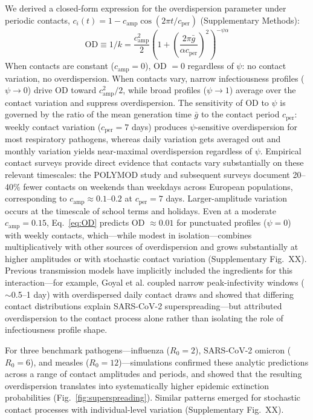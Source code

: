 \documentclass[10pt]{article}
\begin{document}
We derived a closed-form expression for the overdispersion parameter under periodic contacts, $c_i(t) = 1 - c_\text{amp}\cos(2\pi t / c_\text{per})$ (Supplementary Methods):
%
\begin{equation}
	\text{OD} \equiv 1/k = \frac{c_\text{amp}^2}{2} \left(1 + \left(\frac{2\pi \bar{g}}{\alpha c_\text{per}}\right)^2\right)^{-\psi\alpha}
	\label{eq:OD}
\end{equation}
%
When contacts are constant ($c_\text{amp} = 0$), OD $= 0$ regardless of $\psi$: no contact variation, no overdispersion. When contacts vary, narrow infectiousness profiles ($\psi \to 0$) drive OD toward $c_\text{amp}^2/2$, while broad profiles ($\psi \to 1$) average over the contact variation and suppress overdispersion. The sensitivity of OD to $\psi$ is governed by the ratio of the mean generation time $\bar{g}$ to the contact period $c_\text{per}$: weekly contact variation ($c_\text{per} = 7$ days) produces $\psi$-sensitive overdispersion for most respiratory pathogens, whereas daily variation gets averaged out and monthly variation yields near-maximal overdispersion regardless of $\psi$. Empirical contact surveys provide direct evidence that contacts vary substantially on these relevant timescales: the POLYMOD study\citep{mossong_social_2008} and subsequent surveys\citep{jarvis_quantifying_2020} document 20--40\% fewer contacts on weekends than weekdays across European populations, corresponding to $c_\text{amp} \approx 0.1$--$0.2$ at $c_\text{per} = 7$ days. Larger-amplitude variation occurs at the timescale of school terms and holidays. Even at a moderate $c_\text{amp} = 0.15$, Eq.~\ref{eq:OD} predicts OD $\approx 0.01$ for punctuated profiles ($\psi = 0$) with weekly contacts, which---while modest in isolation---combines multiplicatively with other sources of overdispersion and grows substantially at higher amplitudes or with stochastic contact variation (Supplementary Fig.~XX). Previous transmission models have implicitly included the ingredients for this interaction---for example, Goyal et al.\citep{goyal_viral_2021} coupled narrow peak-infectivity windows ($\sim$0.5--1 day) with overdispersed daily contact draws and showed that differing contact distributions explain SARS-CoV-2 superspreading---but attributed overdispersion to the contact process alone rather than isolating the role of infectiousness profile shape.

For three benchmark pathogens---influenza ($R_0 = 2$), SARS-CoV-2 omicron ($R_0 = 6$), and measles ($R_0 = 12$)---simulations confirmed these analytic predictions across a range of contact amplitudes and periods, and showed that the resulting overdispersion translates into systematically higher epidemic extinction probabilities (Fig.~\ref{fig:superspreading}). Similar patterns emerged for stochastic contact processes with individual-level variation (Supplementary Fig.~XX).
\end{document}
